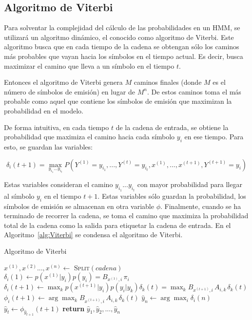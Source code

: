 \subsection{Algoritmo de Viterbi}

Para solventar la complejidad del cálculo de las probabilidades en un HMM, se utilizará un algoritmo dinámico, el conocido como algoritmo de Viterbi. Este algoritmo busca que en cada tiempo de la cadena se obtengan sólo los caminos más probables que vayan hacia los símbolos en el tiempo actual. Es decir, busca maximizar el camino que lleva a un símbolo en el tiempo $t$.

Entonces el algoritmo de Viterbi genera $M$ caminos finales (donde $M$ es el número de símbolos de emisión) en lugar de $M^n$. De estos caminos toma el más probable como aquel que contiene los símbolos de emisión que maximizan la probabilidad en el modelo.

De forma intuitiva, en cada tiempo $t$ de la cadena de entrada, se obtiene la probabilidad que maximiza el camino hacia cada símbolo $y_i$ en ese tiempo. Para esto, se guardan las variables:

\begin{equation*}
\delta_i(t+1) = \max_{y_{i_1}...y_{i_t}} P(Y^{(1)}=y_{i_1}, ...,Y^{(t)}=y_{i_t}, x^{(1)},...,x^{(t+1)}, Y^{(t+1)}=y_i)
\end{equation*}

Estas variables consideran el camino $y_{i_1}...y_{i_t}$ con mayor probabilidad para llegar al símbolo $y_i$ en el tiempo $t+1$. Estas variables sólo guardan la probabilidad, los símbolos de emisión se almacenan en otra variable $\phi$. Finalmente, cuando se ha terminado de recorrer la cadena, se toma el camino que maximiza la probabilidad total de la cadena como la salida para etiquetar la cadena de entrada. En el Algoritmo~\ref{alg:Viterbi} se condensa el algoritmo de Viterbi.



\begin{algorithm}
 \caption{Algoritmo de Viterbi}\label{alg:Viterbi}
 \begin{algorithmic}
    \State $x^{(1)},x^{(2)}...,x^{(n)} \leftarrow$ \textsc{Split}$(cadena)$
    \State $\delta_i(1) \leftarrow p(x^{(1)}|y_i) p(y_i) = B_{x^{(1)}, i}\, \pi_i$ 
      \State $\delta_i(t+1) \leftarrow \max_k p(x^{(t+1)}|y_i)p(y_i|y_k)\delta_k(t) = \max_k B_{ x^{(t+1)}, i}\, A_{i,k}\, \delta_k(t) $
      \State $\phi_i(t+1) \leftarrow \arg\max_k B_{ x^{(t+1)}, i}\, A_{i,k}\, \delta_k(t) $
    \EndFor
    \State $\hat{y}_n \leftarrow \arg\max_i \delta_i(n)$
     \State $\hat{y}_t \leftarrow \phi_{\hat{y}_{t+1}}(t+1)$
    \EndFor
    \State \textbf{return} $\hat{y}_1, \hat{y}_2, ..., \hat{y}_n $
  \EndFunction
 \end{algorithmic}
\end{algorithm}

